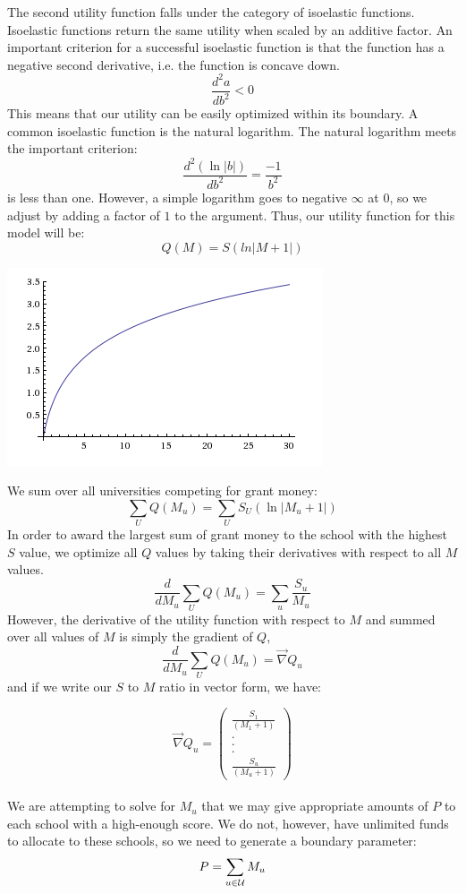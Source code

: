 \documentclass[paper.tex]{subfiles}
\begin{document}
	The second utility function falls under the category of isoelastic functions. Isoelastic functions return the same utility when scaled by an additive factor. \cite{norstad1999introduction}
	An important criterion for a successful isoelastic function is that the function has a negative second derivative, i.e. the function is concave down.  \[\frac{d^2a}{db^2} < 0\] 
	This means that our utility can be easily optimized within its boundary. A common isoelastic function is the natural logarithm. The natural logarithm meets the important criterion: \[\frac{d^2(\ln|b|)}{db^2} = \frac{-1}{b^2}\]  is less than one. However, a simple logarithm goes to negative $\infty$ at $0$, so we adjust by adding a factor of $1$ to the argument. Thus, our utility function for this model will be:
	$$ Q(M) = S(ln|M+1|) $$
\begin{center}
	\includegraphics[width=0.5\linewidth]{images/UF2}
\end{center}
	
	We sum over all universities competing for grant money:
	$$ \sum_{U} Q(M_{u})  = \sum_{U} S_{U}(\ln|M_{u}+1|)  $$
	In order to award the largest sum of grant money to the school with the highest $S$ value, we optimize all $Q$ values by taking their derivatives with respect to all $M$ values.
	$$ \frac{d}{dM_{u}} \sum_{U}Q(M_{u})  = \sum_{u}\frac{S_{u}}{M_{u}} $$
	However, the derivative of the utility function with respect to $M$ and summed over all values of $M$ is simply the gradient of $Q$,
	$$ \frac{d}{dM_{u}} \sum_{U}Q(M_{u}) = \vec{\nabla} Q_{u}   $$
	and if we write our $S$ to $M$ ratio in vector form, we have:
	 
	$$ \vec{\nabla} Q_{u} =  \left( \begin{array}{c}
	\frac{S_{1}}{(M_{1}+1)} \\
	. \\
	.\\
	.\\
	\frac{S_{u}}{(M_{u}+1)}  \end{array} \right) $$
	\\
	
	We are attempting to solve for $M_{u}$ that we may give appropriate amounts of $P$ to each school with a high-enough score. We do not, however, have unlimited funds to allocate to these schools, so we need to generate a boundary parameter:
	$$ P = \sum_{u \in \mathcal{U}} M_{u}   $$
	
\end{document}

